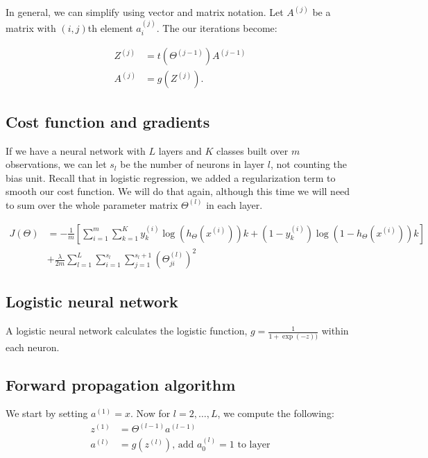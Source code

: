 \documentclass{article}
\begin{document}
In general, we can simplify using vector and matrix notation. Let $A^{(j)}$ be a matrix with $(i,j)$th element $a_i^{(j)}$. The our iterations become:

\begin{align}
Z^{(j)} & = t(\Theta^{(j-1)}) A^{(j-1)} \nonumber \\
A^{(j)} & = g(Z^{(j)}). \nonumber
\end{align}


\subsection{Cost function and gradients}


If we have a neural network with $L$ layers and $K$ classes built over $m$ observations, we can let $s_l$ be the number of neurons in layer $l$, not counting the bias unit. Recall that in logistic regression, we added a regularization term to smooth our cost function. We will do that again, although this time we will need to sum over the whole parameter matrix $\Theta^{(l)}$ in each layer.

\begin{align}
J(\Theta) & = -\frac{1}{m} \left[ \sum_{i=1}^m \sum_{k=1}^K y_k^{(i)} \log(h_\Theta(x^{(i)}))k + (1 - y^{(i)}_k)\log(1 - h_\Theta(x^{(i)}))k \right] \nonumber \\
& + \frac{\lambda}{2m} \sum_{l=1}^L \sum_{i=1}^{s_l} \sum_{j=1}^{s_{l}+1} (\Theta_{ji}^{(l)})^2 \nonumber
\end{align}


\subsection{Logistic neural network}

A logistic neural network calculates the logistic function, $g = \frac{1}{1+\exp(-z))}$ within each neuron. 

\subsection{Forward propagation algorithm}

We start by setting $a^{(1)} = x$. Now for $l = 2, \dots, L$, we compute the following:
\begin{align}
z^{(1)} & = \Theta^{(l-1)}a^{(l-1)} \nonumber \\
a^{(l)} & = g(z^{(l)}) \mbox{, add $a_0^{(l)}=1$ to layer} \nonumber
\end{align}
\end{document}
